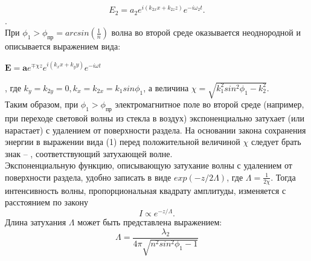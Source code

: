\documentclass[12pt]{article}
\begin{document}
\begin{equation}
E_2 = a_2 e^{i(k_{2x}x + k_{2z}z)}e^{-i\omega_2 t}.
\end{equation}
.\\
При $\phi_1 > \phi_{\text{пр}} = arcsin(\frac{1}{n})$ волна во второй среде оказывается неоднородной и описывается выражением вида:
\begin{center}
$\textbf{E} = \textbf{a}e^{\mp \chi z}e^{i(k_x x + k_y y)}e^{-i\omega t}$
\end{center}, где $k_y = k_{2y} = 0, k_x = k_{2x} = k_1 sin\phi_1 $, а величина $\chi = \sqrt{k^2_1 sin^2\phi_1 - k_2^2}$.\\  [0.2 cm]
Таким образом, при $\phi_1 > \phi_{\text{пр}}$ электромагнитное поле во второй среде
(например, при переходе световой волны из стекла в воздух) экспоненциально затухает (или нарастает) с удалением от поверхности раздела. На основании закона сохранения энергии в выражении вида (1) перед положительной величиной $\chi$ следует брать знак – , соответствующий затухающей волне.\\ [0.2 cm]
Экспоненциальную функцию, описывающую затухание волны с удалением от поверхности раздела, удобно записать в виде $exp(-z/2\Lambda)$, где $\Lambda = \frac{1}{2\chi}$. Тогда интенсивность волны, пропорциональная квадрату амплитуды, изменяется с расстоянием по закону\\
\begin{equation}
 I \propto e^{-z/\Lambda}.
\end{equation} 
Длина затухания $\Lambda$ может быть представлена выражением:
\begin{equation}
\Lambda = \frac{\lambda_2}{4\pi\sqrt{n^2 sin^2\phi_1 - 1}}
\end{equation}
\end{document}
